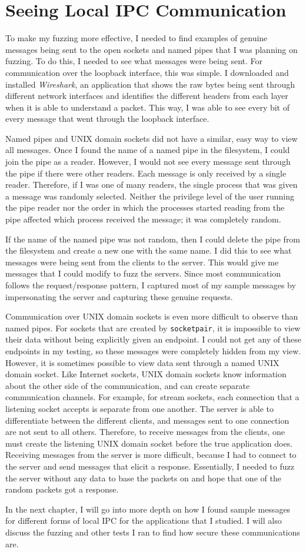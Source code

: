 \section{Seeing Local IPC Communication}
\label{sec:seeingLocalIPC}
To make my fuzzing more effective, I needed to find examples of genuine messages being sent to the open sockets and named pipes that I was planning on fuzzing.  To do this, I needed to see what messages were being sent.  For communication over the loopback interface, this was simple.  I downloaded and installed \textit{Wireshark}, an application that shows the raw bytes being sent through different network interfaces and identifies the different headers from each layer when it is able to understand a packet.  This way, I was able to see every bit of every message that went through the loopback interface.

Named pipes and UNIX domain sockets did not have a similar, easy way to view all messages.  Once I found the name of a named pipe in the filesystem, I could join the pipe as a reader.  However, I would not see every message sent through the pipe if there were other readers.  Each message is only received by a single reader.  Therefore, if I was one of many readers, the single process that was given a message was randomly selected.  Neither the privilege level of the user running the pipe reader nor the order in which the processes started reading from the pipe affected which process received the message; it was completely random.

If the name of the named pipe was not random, then I could delete the pipe from the filesystem and create a new one with the same name.  I did this to see what messages were being sent from the clients to the server.  This would give me messages that I could modify to fuzz the servers.  Since most communication follows the request/response pattern, I captured most of my sample messages by impersonating the server and capturing these genuine requests.

Communication over UNIX domain sockets is even more difficult to observe than named pipes.  For sockets that are created by \texttt{socketpair}, it is impossible to view their data without being explicitly given an endpoint.  I could not get any of these endpoints in my testing, so these messages were completely hidden from my view.  However, it is sometimes possible to view data sent through a named UNIX domain socket.  Like Internet sockets, UNIX domain sockets know information about the other side of the communication, and can create separate communication channels.  For example, for stream sockets, each connection that a listening socket accepts is separate from one another.  The server is able to differentiate between the different clients, and messages sent to one connection are not sent to all others.  Therefore, to receive messages from the clients, one must create the listening UNIX domain socket before the true application does.  Receiving messages from the server is more difficult, because I had to connect to the server and send messages that elicit a response.  Essentially, I needed to fuzz the server without any data to base the packets on and hope that one of the random packets got a response.

In the next chapter, I will go into more depth on how I found sample messages for different forms of local IPC for the applications that I studied.  I will also discuss the fuzzing and other tests I ran to find how secure these communications are.

